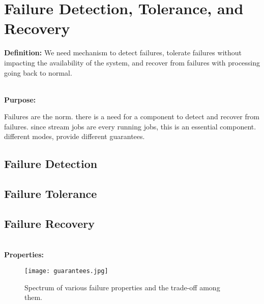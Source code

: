 \section{Failure Detection, Tolerance, and Recovery}
\label{sec:fault}


\noindent\textbf{Definition:} 
We need mechanism to detect failures, tolerate failures without impacting the availability of the system, and recover from failures with processing going back to normal.


\noindent \textbf{\\Purpose:} 

Failures are the norm. there is a need for a component to detect and recover from failures. since stream jobs are every running jobs, this is an essential component. different modes, provide different guarantees.

\subsection{Failure Detection}
\subsection{Failure Tolerance}
\subsection{Failure Recovery}

\noindent \textbf{\\Properties:}


	\begin{figure}[h]
	\centering
	\texttt{[image: guarantees.jpg]}
	\caption{Spectrum of various failure properties and the trade-off among them.}
	\label{fig:failure}
\end{figure}

